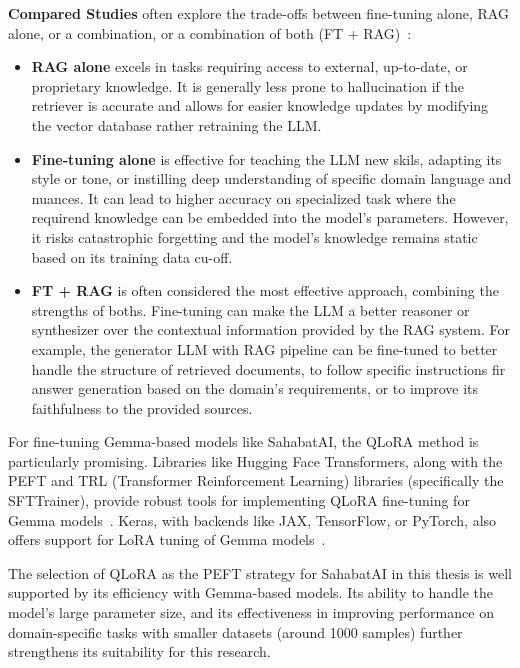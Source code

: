 \documentclass[12pt]{report}
\begin{document}
\textbf{Compared Studies} often explore the trade-offs between fine-tuning alone, RAG alone, or a combination, or a combination of both (FT + RAG)~\cite{balaguer2024ragvsfinetuningpipelines,alghisi2024finetuneragevaluatingdifferent,ovadia2024finetuningretrievalcomparingknowledge}:
\begin{itemize}
    \item \textbf{RAG alone} excels in tasks requiring access to external, up-to-date, or proprietary knowledge. It is generally less prone to hallucination if the retriever is accurate and allows for easier knowledge updates by modifying the vector database rather retraining the LLM.
    \item \textbf{Fine-tuning alone} is effective for teaching the LLM new skils, adapting its style or tone, or instilling deep understanding of specific domain language and nuances. It can lead to higher accuracy on specialized task where the requirend knowledge can be embedded into the model's parameters. However, it risks catastrophic forgetting and the model's knowledge remains static based on its training data cu-off.
    \item \textbf{FT + RAG} is often considered the most effective approach, combining the strengths of boths. Fine-tuning can make the LLM a better reasoner or synthesizer over the contextual information provided by the RAG system. For example, the generator LLM with RAG pipeline can be fine-tuned to better handle the structure of retrieved documents, to follow specific instructions fir answer generation based on the domain's requirements, or to improve its faithfulness to the provided sources.
\end{itemize}

For fine-tuning Gemma-based models like SahabatAI, the QLoRA method is particularly promising. Libraries like Hugging Face Transformers, along with the PEFT and TRL (Transformer Reinforcement Learning) libraries (specifically the SFTTrainer), provide robust tools for implementing QLoRA fine-tuning for Gemma models~\cite{gemma_qlora_2025}. Keras, with backends like JAX, TensorFlow, or PyTorch, also offers support for LoRA tuning of Gemma models~\cite{gemma_lora_2025}.

The selection of QLoRA as the PEFT strategy for SahabatAI in this thesis is well supported by its efficiency with Gemma-based models. Its ability to handle the model's large parameter size, and its effectiveness in improving performance on domain-specific tasks with smaller datasets (around 1000 samples) further strengthens its suitability for this research. 
\end{document}
